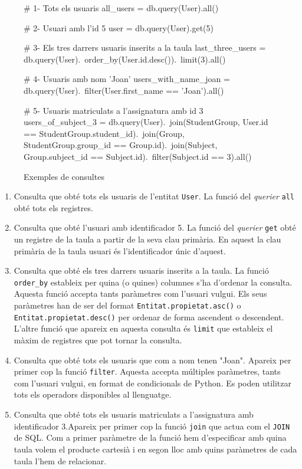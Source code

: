 \begin{figure}
  	\begin{python}
# 1- Tots els usuaris
all_users = db.query(User).all()

# 2- Usuari amb l'id 5
user = db.query(User).get(5)

# 3- Els tres darrers usuaris inserits a la taula 
last_three_users = db.query(User).\
				order_by(User.id.desc()).\
				limit(3).all()

# 4- Usuaris amb nom 'Joan'
users_with_name_joan = db.query(User).\
				filter(User.first_name == 'Joan').all()
											
# 5- Usuaris matriculats a l'assignatura amb id 3
users_of_subject_3 = db.query(User).\
				join(StudentGroup, User.id == StudentGroup.student_id).\
				join(Group, StudentGroup.group_id == Group.id).\
				join(Subject, Group.subject_id == Subject.id).\
				filter(Subject.id == 3).all()
				
	\end{python}
	\caption{Exemples de consultes}
	\label{fig:exemples_consultes}
\end{figure}

	\begin{enumerate}
		\item Consulta que obté tots els usuaris de l'entitat \texttt{User}. La funció del \emph{querier} \texttt{all} obté tots els registres.
		
		\item Consulta que obté l'usuari amb identificador 5. La funció del \emph{querier} \texttt{get} obté un registre de la taula a partir de la seva clau primària. En aquest la clau primària de la taula usuari és l'identificador únic d'aquest.
		
		\item Consulta que obté els tres darrers usuaris inserits a la taula. La funció \texttt{order\_by} estableix per quina (o quines) columnes s'ha d'ordenar la consulta. Aquesta funció accepta tants paràmetres com l'usuari vulgui. Els seus paràmetres han de ser del format \texttt{Entitat.propietat.asc()} o \texttt{Entitat.propietat.desc()} per ordenar de forma ascendent o descendent. L'altre funció que apareix en aquesta consulta és \texttt{limit} que estableix el màxim de registres que pot tornar la consulta.
		
		\item Consulta que obté tots els usuaris que com a nom tenen "Joan". Apareix per primer cop la funció \texttt{filter}. Aquesta accepta múltiples paràmetres, tants com l'usuari vulgui, en format de condicionals de Python. Es poden utilitzar tots els operadors disponibles al llenguatge.
		
		\item Consulta que obté tots els usuaris matriculats a l'assignatura amb identificador 3.Apareix per primer cop la funció \texttt{join} que actua com el \texttt{JOIN} de \ac{SQL}. Com a primer paràmetre de la funció hem d'especificar amb quina taula volem el producte cartesià i en segon lloc amb quins paràmetres de cada taula l'hem de relacionar.
		
	\end{enumerate}
	
